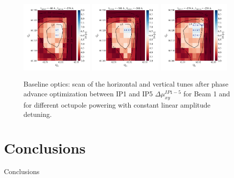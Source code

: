 \documentclass{cernatsnote}
\begin{document}
\begin{figure}[h!]
\centering
\includegraphics[width=0.32\textwidth]{images/q_vs_da_Base_octbad.png} \hfill \includegraphics[width=0.32\textwidth]{images/q_vs_da_Base_oct300.png} \hfill \includegraphics[width=0.32\textwidth]{images/q_vs_da_Base_octoptim.png} \\
\caption{\label{da_scan_ms14fms14d} Baseline optics: scan of the horizontal and vertical tunes after phase advance optimization between IP1 and IP5 $\Delta\mu_{xy}^{IP1-5}$ for Beam 1 and for different octupole powering with constant linear amplitude detuning.}
\end{figure}



\clearpage
\section{Conclusions}

Conclusions
\end{document}
